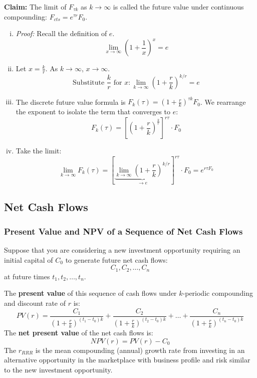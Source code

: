 \textbf{Claim: } The limit of \(F_{\tau k}\) as \(k \to \infty\) is called the future value under continuous compounding: \(F_{cts} = e^{\tau r}F_0\).
\begin{enumerate}[i.]
    \item \textit{Proof: } Recall the definition of \(e\).
    \[
    \lim_{x \to \infty} \left(1 + \frac{1}{x}\right)^x = e
    \]

    \item Let \(x = \frac{k}{r}\). As \(k \to \infty\), \(x \to \infty\).
    \[
    \text{Substitute } \frac{k}{r} \text{ for } x: \lim_{k \to \infty} \left(1 + \frac{r}{k}\right)^{k/r} = e
    \]

    \item The discrete future value formula is \(F_k(\tau) = \left(1 + \frac{r}{k}\right)^{\tau k} F_0\). We rearrange the exponent to isolate the term that converges to \(e\):
    \[
    F_k(\tau) = \left[ \left(1 + \frac{r}{k}\right)^{\frac{k}{r}} \right]^{r \tau} \cdot F_0
    \]

    \item Take the limit:
    \[
    \lim_{k \to \infty} F_k(\tau) = \left[ \underbrace{\lim_{k \to \infty} \left(1 + \frac{r}{k}\right)^{k/r}}_{\to e} \right]^{r \tau} \cdot F_0 = e^{r \tau F_0}
    \]
\end{enumerate}

\subsection{Net Cash Flows}
\subsubsection{Present Value and NPV of a Sequence of Net Cash Flows}
Suppose that you are considering a new investment opportunity requiring an initial capital of \(C_0\) to generate future net cash flows:
\begin{equation*}
    C_1, C_2, \dots, C_n
\end{equation*}
at future times \(t_1, t_2, \dots, t_n\).

The \textbf{present value} of this sequence of cash flows under \(k\)-periodic compounding and discount rate of \(r\) is:
\begin{equation*}
    PV(r) = \frac{C_1}{(1+\frac{r}{k})^{(t_1 - t_0)k}} + \frac{C_2}{(1+\frac{r}{k})^{(t_2 - t_0)k}} + \dots + \frac{C_n}{(1+\frac{r}{k})^{(t_n - t_0)k}}
\end{equation*}
The \textbf{net present value} of the net cash flows is:
\begin{equation*}
    NPV(r) = PV(r) - C_0
\end{equation*}
The \(r_{RRR}\) is the mean compounding (annual) growth rate from investing in an alternative opportunity in the marketplace with business profile and risk similar to the new investment opportunity.


